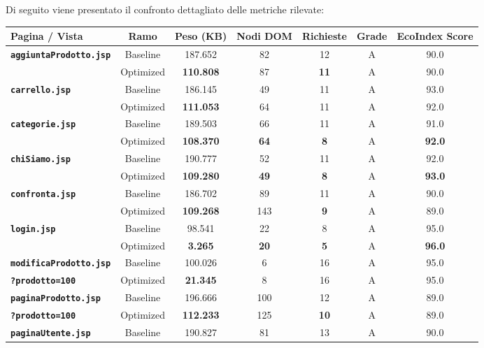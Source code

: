 Di seguito viene presentato il confronto dettagliato delle metriche rilevate:
\begin{table}[h!]
\centering
\begin{tabular}{|l|c|c|c|c|c|c|}
\hline
\textbf{Pagina / Vista} & \textbf{Ramo} & \textbf{Peso (KB)} & \textbf{Nodi DOM} & \textbf{Richieste} & \textbf{Grade} & \textbf{EcoIndex Score} \\ \hline
\hline
\textbf{\texttt{aggiuntaProdotto.jsp}} & Baseline & 187.652 & 82 & 12 & A & 90.0 \\ \cline{2-7} 
& Optimized & \textbf{110.808} & 87 & \textbf{11} & A & 90.0 \\ \hline
\hline
\textbf{\texttt{carrello.jsp}} & Baseline & 186.145 & 49 & 11 & A & 93.0 \\ \cline{2-7} 
& Optimized & \textbf{111.053} & 64 & 11 & A & 92.0 \\ \hline
\hline
\textbf{\texttt{categorie.jsp}} & Baseline & 189.503 & 66 & 11 & A & 91.0 \\ \cline{2-7} 
& Optimized & \textbf{108.370} & \textbf{64} & \textbf{8} & A & \textbf{92.0} \\ \hline
\hline
\textbf{\texttt{chiSiamo.jsp}} & Baseline & 190.777 & 52 & 11 & A & 92.0 \\ \cline{2-7} 
& Optimized & \textbf{109.280} & \textbf{49} & \textbf{8} & A & \textbf{93.0} \\ \hline
\hline
\textbf{\texttt{confronta.jsp}} & Baseline & 186.702 & 89 & 11 & A & 90.0 \\ \cline{2-7} 
& Optimized & \textbf{109.268} & 143 & \textbf{9} & A & 89.0 \\ \hline
\hline
\textbf{\texttt{login.jsp}} & Baseline & 98.541 & 22 & 8 & A & 95.0 \\ \cline{2-7} 
& Optimized & \textbf{3.265} & \textbf{20} & \textbf{5} & A & \textbf{96.0} \\ \hline
\hline
\textbf{\texttt{modificaProdotto.jsp}} & Baseline & 100.026 & 6 & 16 & A & 95.0 \\ \cline{2-7} 
\textbf{\texttt{?prodotto=100}} & Optimized & \textbf{21.345} & 8 & 16 & A & 95.0 \\ \hline
\hline
\textbf{\texttt{paginaProdotto.jsp}} & Baseline & 196.666 & 100 & 12 & A & 89.0 \\ \cline{2-7} 
\textbf{\texttt{?prodotto=100}} & Optimized & \textbf{112.233} & 125 & \textbf{10} & A & 89.0 \\ \hline
\hline
\textbf{\texttt{paginaUtente.jsp}} & Baseline & 190.827 & 81 & 13 & A & 90.0 \\ \cline{2-7} 

\end{tabular}
\end{table}
